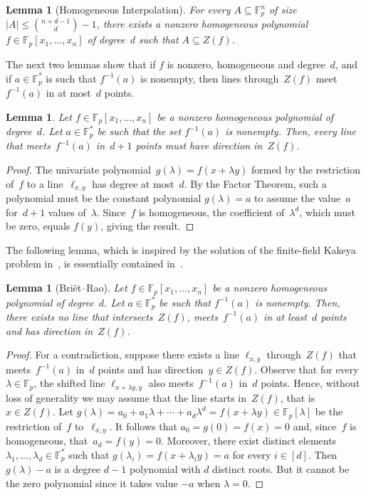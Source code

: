 \documentclass[11pt]{article}
\numberwithin{equation}{section}
\newtheorem{lemma}[theorem]{Lemma}
\theoremstyle{definition}
\theoremstyle{plain}
\newcommand{\F}{{\mathbb{F}}}
\begin{document}
\begin{lemma}[Homogeneous Interpolation]\label{lem:hom-interpolation}
For every $A\subseteq \F_p^n$ of size $|A| \leq \binom{n+d-1}{d} - 1$,
there exists a nonzero homogeneous polynomial $f\in\F_p[x_1,\dots,x_n]$ of degree~$d$ such that $A\subseteq Z(f)$.
\end{lemma}

The next two lemmas show that if $f$ is nonzero, homogeneous and degree~$d$, and if $a\in\F_p^*$ is such that $f^{-1}(a)$ is nonempty, then  lines through~$Z(f)$ meet~$f^{-1}(a)$ in at most~$d$ points.

\begin{lemma}\label{lem:zerodirection}
Let $f\in\F_p[x_1,\dots,x_n]$ be a nonzero homogeneous polynomial of degree~$d$.
Let $a\in\F_p^*$ be such that the set $f^{-1}(a)$ is nonempty.
Then, every line that meets~$f^{-1}(a)$ in~$d+1$ points must have direction in~$Z(f)$.
\end{lemma}

\begin{proof}
The univariate polynomial~$g(\lambda) = f(x + \lambda y)$ formed by the restriction of~$f$ to  a line~$\ell_{x,y}$ has degree at most~$d$.
By the Factor Theorem, such a polynomial must be the constant polynomial $g(\lambda) = a$ to assume the value~$a$ for~$d+1$ values of~$\lambda$.
Since~$f$ is homogeneous, the coefficient of~$\lambda^d$, which must be zero, equals $f(y)$, giving the result.
\end{proof}

The following lemma, which is inspired by the solution of the finite-field Kakeya problem in~\cite{dvir:2009}, is essentially contained in~\cite{BrietRao:2016}.

\begin{lemma}[Bri\"{e}t--Rao]\label{lem:zero-one}
Let $f\in\F_p[x_1,\dots,x_n]$ be a nonzero homogeneous polynomial of degree~$d$.
Let $a\in\F_p^*$ be such that $f^{-1}(a)$ is nonempty.
Then, there exists no line that intersects~$Z(f)$, meets~$f^{-1}(a)$ in at least~$d$ points and has direction in~$Z(f)$.
\end{lemma}

\begin{proof}
For a contradiction, suppose there exists a line $\ell_{x,y}$ through~$Z(f)$ that meets~$f^{-1}(a)$ in~$d$ points and has direction~$y\in Z(f)$.
Observe that for every $\lambda\in\F_p$, the shifted line $\ell_{x + \lambda y, y}$ also meets~$f^{-1}(a)$ in~$d$ points.
Hence, without loss of generality we may assume that the line starts in~$Z(f)$, that is~$x\in Z(f)$.
Let $g(\lambda) = a_0 + a_1\lambda + \cdots + a_d\lambda^d = f(x + \lambda y)\in\F_p[\lambda]$ be the restriction of~$f$ to~$\ell_{x,y}$.
It follows that $a_0 = g(0) = f(x) = 0$ and, since~$f$ is homogeneous, that~$a_d = f(y) = 0$.
Moreover, there exist distinct elements $\lambda_1,\dots,\lambda_d \in \F_p^*$ such that $g(\lambda_i) = f(x+\lambda_i y) = a$ for every $i\in[d]$. Then $g(\lambda)-a$ is a degree $d-1$ polynomial with $d$ distinct roots. But it cannot be the zero polynomial since it takes value $-a$ when $\lambda=0$.
\end{proof}
\end{document}
